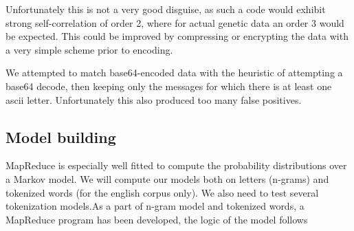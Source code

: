\documentclass[a4paper,11pt]{article}
\begin{document}
Unfortunately this is not a very good disguise, as such a code
would exhibit strong self-correlation of order 2, where for actual genetic data an order 3 would be expected. This could be improved
by compressing or encrypting the data with a very simple scheme prior to encoding.


We attempted to match base64-encoded data with the heuristic of attempting a base64 decode, then keeping only the messages for which there is at least one ascii letter. Unfortunately this also produced too many false positives.



\subsection{Model building}

MapReduce is especially well fitted to compute the probability distributions over a Markov model. We will compute our models both on letters (n-grams) and tokenized words (for the english corpus only). We also need to test several tokenization models.As a part of n-gram model and tokenized words, a MapReduce program has been developed, the logic of the model follows
\end{document}
